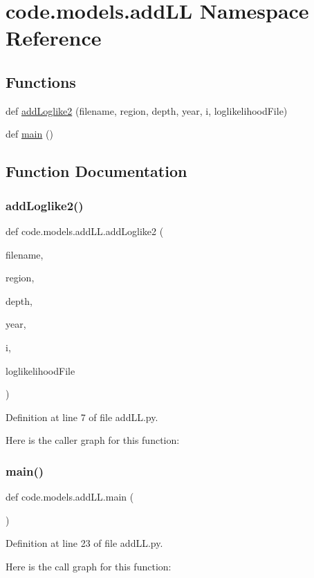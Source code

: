 \hypertarget{namespacecode_1_1models_1_1add_l_l}{}\section{code.\+models.\+add\+LL Namespace Reference}
\label{namespacecode_1_1models_1_1add_l_l}
\subsection*{Functions}
\begin{DoxyCompactItemize}
\item 
def \hyperlink{namespacecode_1_1models_1_1add_l_l_a99377e1e2bf4a7ef93cfc6897d39fea9}{add\+Loglike2} (filename, region, depth, year, i, loglikelihood\+File)
\item 
def \hyperlink{namespacecode_1_1models_1_1add_l_l_a4d84b04f758c7a83a68b317a0817b8fa}{main} ()
\end{DoxyCompactItemize}


\subsection{Function Documentation}
\mbox{\label{namespacecode_1_1models_1_1add_l_l_a99377e1e2bf4a7ef93cfc6897d39fea9}} 
\subsubsection{\texorpdfstring{add\+Loglike2()}{addLoglike2()}}
{\footnotesize\ttfamily def code.\+models.\+add\+L\+L.\+add\+Loglike2 (\begin{DoxyParamCaption}\item[{}]{filename,  }\item[{}]{region,  }\item[{}]{depth,  }\item[{}]{year,  }\item[{}]{i,  }\item[{}]{loglikelihood\+File }\end{DoxyParamCaption})}



Definition at line 7 of file add\+L\+L.\+py.

Here is the caller graph for this function\+:
\mbox{\label{namespacecode_1_1models_1_1add_l_l_a4d84b04f758c7a83a68b317a0817b8fa}} 
\subsubsection{\texorpdfstring{main()}{main()}}
{\footnotesize\ttfamily def code.\+models.\+add\+L\+L.\+main (\begin{DoxyParamCaption}{ }\end{DoxyParamCaption})}



Definition at line 23 of file add\+L\+L.\+py.

Here is the call graph for this function\+:
